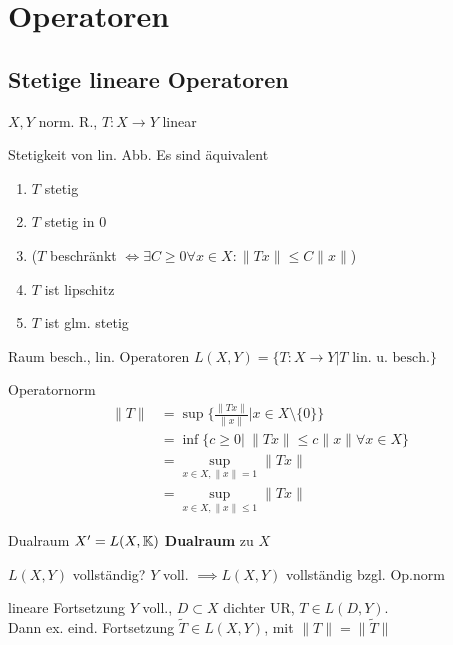 \section{Operatoren}


\subsection{Stetige lineare Operatoren}
$X,Y$ norm. R., $T:X\to Y$ linear\\
\begin{satz}{Stetigkeit von lin. Abb.}
  Es sind äquivalent
  \begin{enumerate}[label = (\roman*)]
    \item $T$ stetig
    \item $T$ stetig in $0$
    \item ($T$ beschränkt $\Leftrightarrow \exists C \geq 0 \forall x \in X:
      \|Tx\| \leq C\|x\|$)
    \item $T$ ist lipschitz
    \item $T$ ist glm. stetig
  \end{enumerate}
\end{satz}

\begin{definition}{Raum besch., lin. Operatoren}
  $L(X,Y)=\{ T:X \to Y|T \text{ lin. u. besch.} \}$
\end{definition}

\begin{definition}{Operatornorm}
  \begin{align*}
    \|T\| &= \sup \{ \frac{\|Tx\|}{\|x\|}| x\in X \setminus \{0\}\} \\
    &= \inf \{ c \geq 0|\ \|Tx\| \leq c \|x\| \forall x\in X \} \\
    &= \sup_{x\in X, \|x\| = 1}\|Tx\| \\
    &= \sup_{x\in X, \|x\| \leq 1}\|Tx\|
  \end{align*}
\end{definition}

\begin{definition}{Dualraum}
  $X' = L(X,\mathbb{K})$ \textbf{Dualraum} zu $X$
\end{definition}

\begin{satz}{$L(X,Y)$ vollständig?}
  $Y$ voll. $\implies L(X,Y)$ vollständig bzgl. Op.norm
\end{satz}

\begin{satz}{lineare Fortsetzung}
  $Y$ voll., $D \subset X$ dichter UR, $T \in L(D,Y)$.\\
  Dann ex. eind. Fortsetzung $\tilde{T} \in L(X,Y)$, mit $\|T\|=\|\tilde{T}\|$
\end{satz}

